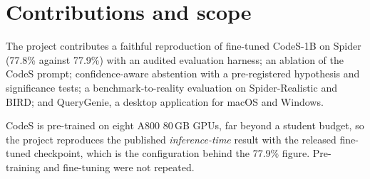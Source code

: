 \section{Contributions and scope}

The project contributes a faithful reproduction of fine-tuned CodeS-1B on Spider \cite{yu2018spider} (77.8\% against 77.9\%) with an audited evaluation harness; an ablation of the CodeS prompt; confidence-aware abstention with a pre-registered hypothesis and significance tests; a benchmark-to-reality evaluation on Spider-Realistic and BIRD; and QueryGenie, a desktop application for macOS and Windows.

CodeS is pre-trained on eight A800 80\,GB GPUs, far beyond a student budget, so the project reproduces the published \emph{inference-time} result with the released fine-tuned checkpoint, which is the configuration behind the 77.9\% figure. Pre-training and fine-tuning were not repeated.
